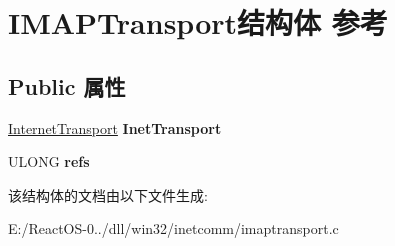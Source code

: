 \hypertarget{struct_i_m_a_p_transport}{}\section{I\+M\+A\+P\+Transport结构体 参考}
\label{struct_i_m_a_p_transport}
\subsection*{Public 属性}
\begin{DoxyCompactItemize}
\item 
\mbox{\label{struct_i_m_a_p_transport_ade3c9fa41e69d23096c004559b04a26e}} 
\hyperlink{struct_internet_transport}{Internet\+Transport} {\bfseries Inet\+Transport}
\item 
\mbox{\label{struct_i_m_a_p_transport_a9faf569227254a4bb7a19c6d7089fd08}} 
U\+L\+O\+NG {\bfseries refs}
\end{DoxyCompactItemize}


该结构体的文档由以下文件生成\+:\begin{DoxyCompactItemize}
\item 
E\+:/\+React\+O\+S-\/0../dll/win32/inetcomm/imaptransport.\+c\end{DoxyCompactItemize}
